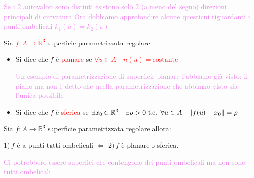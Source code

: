         \textcolor{violet}{Se i $2$ autovalori sono distinti esistono solo $2$ (a meno del segno) direzioni principali di curvatura}
        \newpage
        \textcolor{violet}{Ora dobbiamo approfondire alcune questioni riguardanti i punti ombelicali $k_1(u)=k_2(u)$}
        \begin{definizione}
        \mbox{}

        Sia \textcolor{red}{$f : A \to \mathbb{R}^3$} superficie parametrizzata regolare.
        \begin{itemize}
            \item Si dice che $f$ è \textcolor{red}{planare} se \textcolor{red}{$\forall u \in A \quad n(u) = \text{costante}$}
            
            \textcolor{violet}{Un esempio di parametrizzazione di superficie planare l'abbiamo già visto: il piano ma non è detto che quella parametrizzazione che abbiamo visto sia l'unica possibile}
            \item Si dice che $f$ è \textcolor{red}{sferica} se \textcolor{red}{$\exists x_0 \in \mathbb{R}^3 \quad \exists \rho > 0 \text{ t.c. } \forall u \in A \quad \lVert f(u) - x_0\rVert = \rho$}
        
        \end{itemize}
        \end{definizione}
        \newpage
        \begin{teorema}
        \label{th:caraterizzazione:superfici_a_punti_tutti_ombellicali}
        \mbox{}

        Sia $f : A \to \mathbb{R}^3$ superficie parametrizzata regolare allora:

        $1) \, f$ è a punti tutti ombelicali $\iff$ $2) \, f$ è planare o sferica.

        \textcolor{violet}{Ci potrebbero essere superfici che contengono dei punti ombelicali ma non sono tutti ombelicali}
        \end{teorema}

